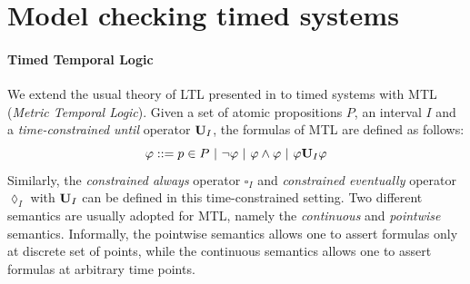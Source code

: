 \documentclass[11pt]{article}
\theoremstyle{definition}
\theoremstyle{remark}
\theoremstyle{definition}
\begin{document}
\section{Model checking timed systems}\label{sec:app}
\paragraph{Timed Temporal Logic}\label{par:timedlogic} We extend the usual theory of LTL presented in \cite[Chapter~2]{handbook} to timed systems with MTL (\emph{Metric Temporal Logic}).
Given a set of atomic propositions $P$, an interval $I$ and a \emph{time-constrained until} operator $\text{\bf U}_I$, the formulas of MTL are defined as follows:
\begin{equation*}
	\varphi ::= p \in P\ |\ \neg \varphi\ |\ \varphi \land \varphi\ |\ \varphi \text{\bf U}_I \varphi
\end{equation*}
Similarly, the \emph{constrained always} operator $\square_I$ and \emph{constrained eventually} operator $\lozenge_I$ with $\text{\bf U}_I$ can be defined in this time-constrained setting. Two different semantics are usually adopted for MTL, namely the \emph{continuous} and \emph{pointwise} semantics. Informally, the pointwise semantics allows one to assert formulas only at discrete set of points, while the continuous semantics allows one to assert formulas at arbitrary time points.



\end{document}
